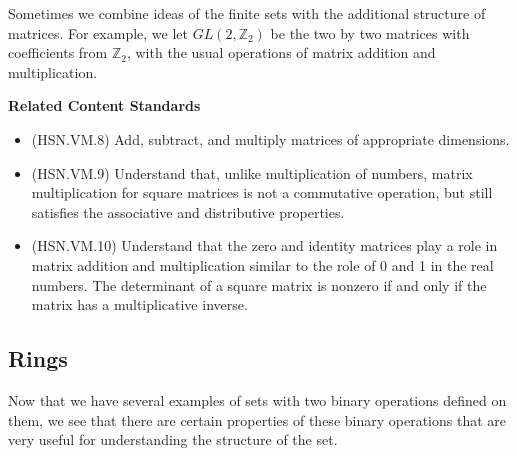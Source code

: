\documentclass[
]{book}
\providecommand{\tightlist}{%
  \setlength{\itemsep}{0pt}\setlength{\parskip}{0pt}}
\newenvironment{standards}{}{}
\theoremstyle{definition}
\theoremstyle{definition}
\theoremstyle{definition}
\theoremstyle{definition}
\theoremstyle{remark}
\begin{document}
Sometimes we combine ideas of the finite sets with the additional structure of matrices. For example, we let \(GL(2,\mathbb{Z}_2)\) be the two by two matrices with coefficients from \(\mathbb{Z}_2\), with the usual operations of matrix addition and multiplication.

\begin{standards}

\begin{center}
\textbf{Related Content Standards}

\end{center}

\begin{itemize}
\tightlist
\item
  (HSN.VM.8) Add, subtract, and multiply matrices of appropriate dimensions.
\item
  (HSN.VM.9) Understand that, unlike multiplication of numbers, matrix multiplication for square matrices is not a commutative operation, but still satisfies the associative and distributive properties.
\item
  (HSN.VM.10) Understand that the zero and identity matrices play a role in matrix addition and multiplication similar to the role of 0 and 1 in the real numbers. The determinant of a square matrix is nonzero if and only if the matrix has a multiplicative inverse.
\end{itemize}

\end{standards}

\hypertarget{rings}{%
\subsection{Rings}\label{rings}}

Now that we have several examples of sets with two binary operations defined on them, we see that there are certain properties of these binary operations that are very useful for understanding the structure of the set.
\end{document}
